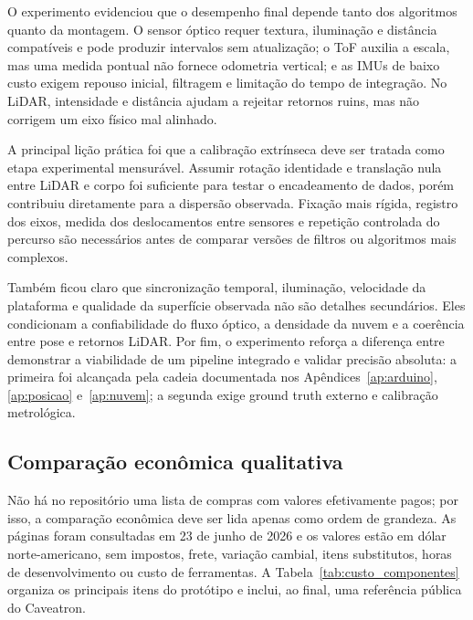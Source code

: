 O experimento evidenciou que o desempenho final depende tanto dos algoritmos quanto da montagem. O sensor óptico requer textura, iluminação e distância compatíveis e pode produzir intervalos sem atualização; o ToF auxilia a escala, mas uma medida pontual não fornece odometria vertical; e as IMUs de baixo custo exigem repouso inicial, filtragem e limitação do tempo de integração. No LiDAR, intensidade e distância ajudam a rejeitar retornos ruins, mas não corrigem um eixo físico mal alinhado.

A principal lição prática foi que a calibração extrínseca deve ser tratada como etapa experimental mensurável. Assumir rotação identidade e translação nula entre LiDAR e corpo foi suficiente para testar o encadeamento de dados, porém contribuiu diretamente para a dispersão observada. Fixação mais rígida, registro dos eixos, medida dos deslocamentos entre sensores e repetição controlada do percurso são necessários antes de comparar versões de filtros ou algoritmos mais complexos.

Também ficou claro que sincronização temporal, iluminação, velocidade da plataforma e qualidade da superfície observada não são detalhes secundários. Eles condicionam a confiabilidade do fluxo óptico, a densidade da nuvem e a coerência entre pose e retornos LiDAR. Por fim, o experimento reforça a diferença entre demonstrar a viabilidade de um pipeline integrado e validar precisão absoluta: a primeira foi alcançada pela cadeia documentada nos Apêndices~\ref{ap:arduino}, \ref{ap:posicao} e~\ref{ap:nuvem}; a segunda exige ground truth externo e calibração metrológica.

\subsection{Comparação econômica qualitativa}

Não há no repositório uma lista de compras com valores efetivamente pagos; por isso, a comparação econômica deve ser lida apenas como ordem de grandeza. As páginas foram consultadas em 23 de junho de 2026 e os valores estão em dólar norte-americano, sem impostos, frete, variação cambial, itens substitutos, horas de desenvolvimento ou custo de ferramentas. A Tabela~\ref{tab:custo_componentes} organiza os principais itens do protótipo e inclui, ao final, uma referência pública do Caveatron.

